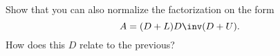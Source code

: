   Show that you can also normalize the factorization on the form
  \[ A=(D+L)D\inv (D+U). \]
  How does this $D$ relate to the previous?
